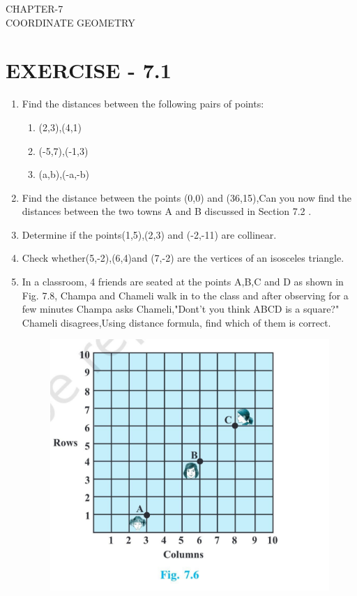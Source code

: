 \documentclass[12pt]{article}
\begin{document}
\begin{center}
\textbf\large{CHAPTER-7 \\ COORDINATE GEOMETRY}
\end{center}

\section{EXERCISE - 7.1}
\begin{enumerate}
\item Find the distances between the following pairs of points:
\begin{enumerate}
\item (2,3),(4,1)
\item (-5,7),(-1,3)
\item (a,b),(-a,-b)
\end{enumerate}
\item Find the distance between the points (0,0) and (36,15),Can you now find the distances between the two towns A and B discussed in Section 7.2 .
\item Determine if the points(1,5),(2,3) and (-2,-11) are collinear.
\item Check whether(5,-2),(6,4)and (7,-2) are the vertices of an isosceles triangle.
\item  In a classroom, 4 friends are seated at the points A,B,C and D as shown in Fig. 7.8, Champa and Chameli walk in to the class and after observing for a few minutes Champa asks Chameli,"Dont't you think ABCD is a square?" Chameli disagrees,Using distance formula, find which of them is correct.

\begin{figure}[H]
          \centering
          \includegraphics[scale=0.1]{canvas.jpg}
      \end{figure}



\end{enumerate}
\end{document}
